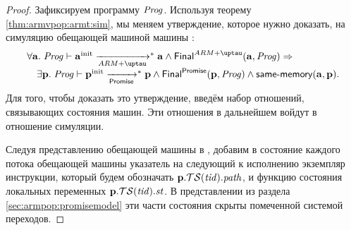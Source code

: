 \newcommand{\TSfprom}{\TSf}
\begin{proof}
  Зафиксируем программу $\mathit{Prog}$.
  Используя теорему \ref{thm:armvpop:armt:sim}, мы меняем утверждение, которое нужно
  доказать, на симуляцию обещающей машиной машины \ARMt:
\[\begin{array}{l}
  \forall \aT. \; \Cfprom \vdash \ainit \armStep^{*} \aT \land \finalStateA(\aT, \Cfarm) \Rightarrow \\
  \quad \exists \p. \; \Cfprom \vdash \pinit \promStep^{*} \p \land \finalStateProm(\p, \Cfprom) \land \sameMemory(\aT, \p). \\
\end{array}\]
Для того, чтобы доказать это утверждение, введём набор отношений, связывающих
состояния машин. Эти отношения в дальнейшем войдут в отношение симуляции.

Следуя представлению обещающей машины в \cite{Podkopaev-al:ECOOP17}, добавим в состояние
каждого потока обещающей машины указатель на следующий к исполнению экземпляр инструкции,
который будем обозначать $\mathbf{p}.\mathcal{TS}(\mathit{tid}).\mathit{path}$, и функцию состояния локальных
переменных $\mathbf{p}.\mathcal{TS}(\mathit{tid}).\mathit{st}$.
В представлении из раздела \ref{sec:armpop:promisemodel} эти части состояния скрыты
помеченной системой переходов.


\end{proof}
